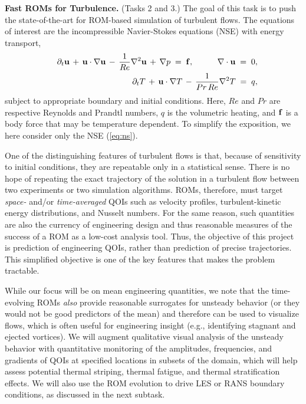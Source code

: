 \vspace{.08in}
\noindent \textbf{Fast ROMs for Turbulence.} (Tasks 2 and 3.)
The goal of this task is to push the state-of-the-art for ROM-based 
simulation of turbulent flows.
The equations of interest are the incompressible Navier-Stokes equations
(NSE) with energy transport, \\[-2.6ex]
\begin{eqnarray} \label{eq:ns}
&&
\partial_t \mathbf{u} \,+\, \mathbf{u} \cdot \nabla \mathbf{u} \,-\, \frac{1}{Re} \nabla^2 \mathbf{u}
\,+\, \nabla p \;=\; \mathbf{f}, \hspace*{.4in} \nabla \cdot \mathbf{u} \;=\; 0, 
\\ \label{eq:therm} 
&&
\partial_t T   \,+\, \mathbf{u} \cdot \nabla T   \,-\, \frac{1}{Pr\,Re} \nabla^2 T
\;=\; q, 
\end{eqnarray}
subject to appropriate boundary and initial conditions. Here, $Re$ and $Pr$ are
respective Reynolds and Prandtl numbers, $q$ is the volumetric heating, and
$\mathbf{f}$ is a body force that may be temperature dependent.
   To simplify the exposition, we here consider only the NSE (\ref{eq:ns}).

One of the distinguishing features of turbulent flows is that, because of
sensitivity to initial conditions, they are repeatable only in a statistical
sense.  There is no hope of repeating the exact trajectory of the solution in a
turbulent flow between two experiments or two simulation algorithms.  ROMs,
therefore, must target {\em space-} and/or {\em time-averaged} QOIs such as
velocity profiles,  turbulent-kinetic energy distributions, and Nusselt
numbers.  For the same reason, such quantities are also the currency of
engineering design and thus reasonable measures of the success of a ROM as a
low-cost analysis tool.  Thus, the objective of this project is prediction of
engineering QOIs, rather than prediction of precise trajectories.  This
simplified objective is one of the key features that makes the problem
tractable.

    While our focus will be on mean engineering quantities, we note that the
time-evolving ROMs {\em also} provide reasonable surrogates for unsteady
behavior (or they would not be good predictors of the mean) and therefore can
be used to visualize flows, which is often useful for engineering insight
(e.g., identifying stagnant and ejected vortices).  We will augment
qualitative visual analysis of the unsteady behavior with quantitative
monitoring of the amplitudes, frequencies, and gradients of QOIs at specified
locations in subsets of the domain, which will help assess potential
thermal striping, thermal fatigue, and thermal stratification effects.
We will also use the ROM evolution to drive LES or RANS boundary conditions,
as discussed in the next subtask.

